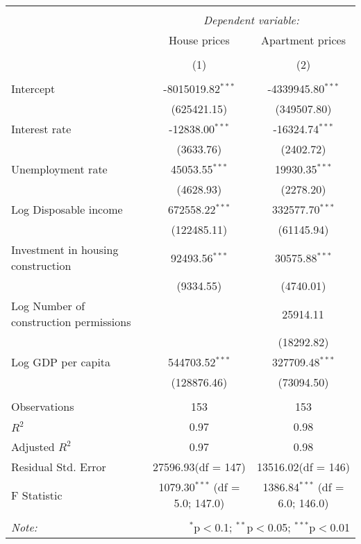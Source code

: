 \begin{table}[!htbp] \centering
\begin{tabular}{@{\extracolsep{5pt}}lcc}
\\[-1.8ex]\hline
\hline \\[-1.8ex]
& \multicolumn{2}{c}{\textit{Dependent variable:}} \
\cr \cline{2-3}
\\[-1.8ex] & \multicolumn{1}{c}{House prices} & \multicolumn{1}{c}{Apartment prices}  \\
\\[-1.8ex] & (1) & (2) \\
\hline \\[-1.8ex]
 Intercept & -8015019.82$^{***}$ & -4339945.80$^{***}$ \\
  & (625421.15) & (349507.80) \\
 Interest rate & -12838.00$^{***}$ & -16324.74$^{***}$ \\
  & (3633.76) & (2402.72) \\
 Unemployment rate & 45053.55$^{***}$ & 19930.35$^{***}$ \\
  & (4628.93) & (2278.20) \\
 Log Disposable income & 672558.22$^{***}$ & 332577.70$^{***}$ \\
  & (122485.11) & (61145.94) \\
 Investment in housing construction & 92493.56$^{***}$ & 30575.88$^{***}$ \\
  & (9334.55) & (4740.01) \\
 Log Number of construction permissions & & 25914.11$^{}$ \\
  & & (18292.82) \\
 Log GDP per capita & 544703.52$^{***}$ & 327709.48$^{***}$ \\
  & (128876.46) & (73094.50) \\
\hline \\[-1.8ex]
 Observations & 153 & 153 \\
 $R^2$ & 0.97 & 0.98 \\
 Adjusted $R^2$ & 0.97 & 0.98 \\
 Residual Std. Error & 27596.93(df = 147) & 13516.02(df = 146)  \\
 F Statistic & 1079.30$^{***}$ (df = 5.0; 147.0) & 1386.84$^{***}$ (df = 6.0; 146.0) \\
\hline
\hline \\[-1.8ex]
\textit{Note:} & \multicolumn{2}{r}{$^{*}$p$<$0.1; $^{**}$p$<$0.05; $^{***}$p$<$0.01} \\
\end{tabular}
\end{table}
